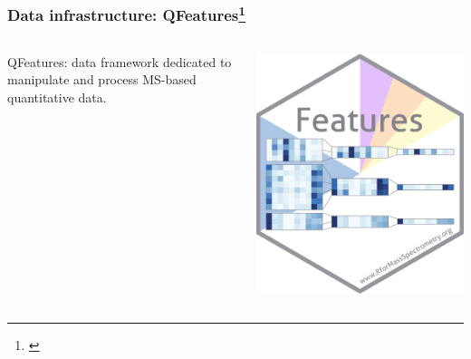 \documentclass{beamer}
\newcommand{\hcode}[2][lgray]{{\ttfamily\color{vdgray}\colorbox{#1}{#2}}}
\newcommand{\frametitlesection}[1]{\frametitle{\centering #1 \footnotesize \hspace{0pt plus 1 filll} \insertsection}}
\begin{document}
\begin{frame}
    \frametitlesection{Data infrastructure: QFeatures\footnote{\citet{QFeatures}}}

    \centering
    \begin{columns}
        \begin{column}{0.8\textwidth}
            \hcode{QFeatures}: data framework dedicated to manipulate and process
            MS-based quantitative data.
        \end{column}
        \begin{column}{0.2\textwidth}
            \includegraphics[width=\linewidth]{figs/sticker_QFeatures.png}
        \end{column}

    \end{columns}

    \bigskip


\end{frame}
\end{document}
